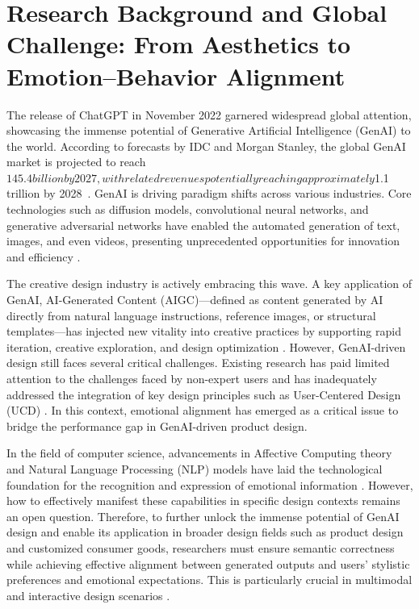\section{Research Background and Global Challenge: From Aesthetics to Emotion–Behavior Alignment}

The release of ChatGPT in November 2022 garnered widespread global attention, showcasing the immense potential of Generative Artificial Intelligence (GenAI) to the world. According to forecasts by IDC and Morgan Stanley, the global GenAI market is projected to reach $145.4 billion by 2027, with related revenues potentially reaching approximately $1.1 trillion by 2028~\cite{JiShuGeXinYinLingWeiLaiShengChengShiAISuZaoHeXinFaZhanYinQing2024,GenAIRevenueCould2025}. GenAI is driving paradigm shifts across various industries. Core technologies such as diffusion models, convolutional neural networks, and generative adversarial networks have enabled the automated generation of text, images, and even videos, presenting unprecedented opportunities for innovation and efficiency \cite{caoComprehensiveSurveyAIgenerated2023,wuAIGCempoweredMethodologyProduct2024}.

The creative design industry is actively embracing this wave. A key application of GenAI, AI-Generated Content (AIGC)—defined as content generated by AI directly from natural language instructions, reference images, or structural templates—has injected new vitality into creative practices by supporting rapid iteration, creative exploration, and design optimization \cite{caoComprehensiveSurveyAIgenerated2023,liUnveilingComplexityDesigners2025,wuAIGCempoweredMethodologyProduct2024}. However, GenAI-driven design still faces several critical challenges. Existing research has paid limited attention to the challenges faced by non-expert users and has inadequately addressed the integration of key design principles such as User-Centered Design (UCD) \cite{maoFactorsInfluencingUser2023,xuEveryoneArtistStudy2023}. In this context, emotional alignment has emerged as a critical issue to bridge the performance gap in GenAI-driven product design\cite{bukerFosteringSelfefficacyUsability2024,demirbilekProductDesignSemantics2003}.

In the field of computer science, advancements in Affective Computing theory and Natural Language Processing (NLP) models have laid the technological foundation for the recognition and expression of emotional information \cite{devlinBERTPretrainingDeep2019,kleine-cosackRecognitionSimulationEmotions2006,liuSentimentAnalysisSubjectivity2010,liuRoBERTaRobustlyOptimized2019,picardAffectiveComputing1997,vaswaniAttentionAllYou2017}. However, how to effectively manifest these capabilities in specific design contexts remains an open question. Therefore, to further unlock the immense potential of GenAI design and enable its application in broader design fields such as product design and customized consumer goods, researchers must ensure semantic correctness while achieving effective alignment between generated outputs and users' stylistic preferences and emotional expectations. This is particularly crucial in multimodal and interactive design scenarios \cite{liWhereAreWe2024,shalev-arkushinImageRAGDynamicImage2025}.

